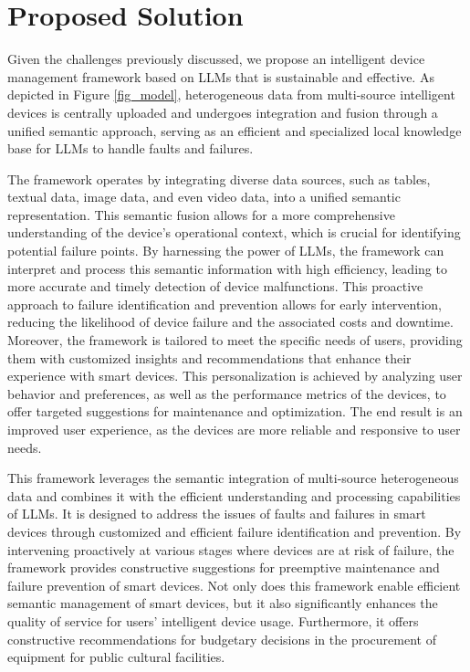 \documentclass[preprint,12pt]{elsarticle}
\begin{document}
\section{Proposed Solution}
Given the challenges previously discussed, we propose an intelligent device management framework based on LLMs that is sustainable and effective. As depicted in Figure \ref{fig_model}, heterogeneous data from multi-source intelligent devices is centrally uploaded and undergoes integration and fusion through a unified semantic approach, serving as an efficient and specialized local knowledge base for LLMs to handle faults and failures. 


The framework operates by integrating diverse data sources, such as tables, textual data, image data, and even video data, into a unified semantic representation. This semantic fusion allows for a more comprehensive understanding of the device's operational context, which is crucial for identifying potential failure points. By harnessing the power of LLMs, the framework can interpret and process this semantic information with high efficiency, leading to more accurate and timely detection of device malfunctions. This proactive approach to failure identification and prevention allows for early intervention, reducing the likelihood of device failure and the associated costs and downtime. Moreover, the framework is tailored to meet the specific needs of users, providing them with customized insights and recommendations that enhance their experience with smart devices. This personalization is achieved by analyzing user behavior and preferences, as well as the performance metrics of the devices, to offer targeted suggestions for maintenance and optimization. The end result is an improved user experience, as the devices are more reliable and responsive to user needs.

This framework leverages the semantic integration of multi-source heterogeneous data and combines it with the efficient understanding and processing capabilities of LLMs. It is designed to address the issues of faults and failures in smart devices through customized and efficient failure identification and prevention. By intervening proactively at various stages where devices are at risk of failure, the framework provides constructive suggestions for preemptive maintenance and failure prevention of smart devices. Not only does this framework enable efficient semantic management of smart devices, but it also significantly enhances the quality of service for users' intelligent device usage. Furthermore, it offers constructive recommendations for budgetary decisions in the procurement of equipment for public cultural facilities.
\end{document}
